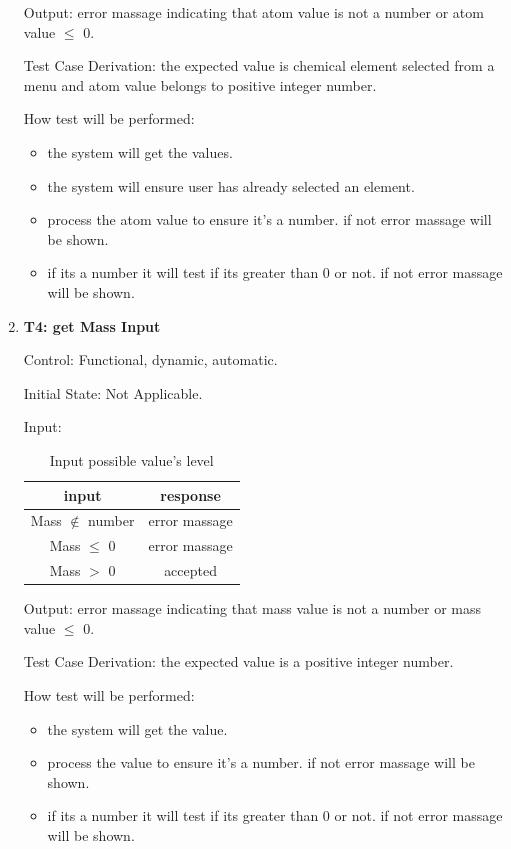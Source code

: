 \documentclass[12pt, titlepage]{article}
\begin{document}
\begin{enumerate}
Output: error massage indicating that atom value is not a number or atom value $\leq$ 0. 

Test Case Derivation: the expected value is chemical element selected from a menu and atom value belongs to positive integer number. 

How test will be performed: 
\begin{itemize}
\item the system will get the values. 
\item the system will ensure user has already selected an element. 
\item process the atom value to ensure it's a number. if not error massage will be shown.
\item if its a number it will test if its greater than 0 or not.  if not error massage will be shown.
\end{itemize}

\item{\bf T4: get Mass Input \\}

Control: Functional, dynamic, automatic.
					
Initial State: Not Applicable.
					
Input: 
\begin{table}[h!]
\centering
\begin{tabular}{|c|c|}
\hline
input & response  \\
\hline
Mass $\notin$ number  & error massage \\ \hline
Mass $\leq$ 0& error massage \\ \hline
Mass $>$ 0  & accepted\\ \hline
\hline
\end{tabular}
\caption{Input possible value's level }
\label{tab:reqtrace}
\end{table}

Output: error massage indicating that mass value is not a number or mass value $\leq$ 0. 

Test Case Derivation: the expected value is a positive integer number. 
					
How test will be performed: 
\begin{itemize}
\item the system will get the value. 
\item process the value to ensure it's a number. if not error massage will be shown.
\item if its a number it will test if its greater than 0 or not.  if not error massage will be shown.
\end{itemize}


\end{enumerate}
\end{document}
